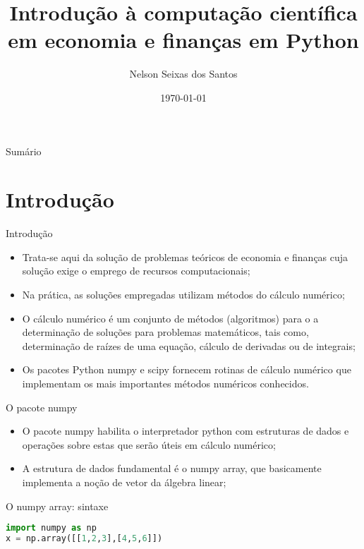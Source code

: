 \documentclass{beamer}
\title[Python2]{Introdução à computação científica em economia e finanças em Python}
\author{Nelson Seixas dos Santos}
\institute{Faculdade de Ciências Econômicas\\Universidade Federal do Rio Grande do Sul}
\date{\today}
\begin{document}
	
	\begin{frame}
		\titlepage
	\end{frame}
	
	\begin{frame}{Sumário}
		\tableofcontents
	\end{frame}
	
	
	
\section{Introdução}
\begin{frame}{Introdução}
\begin{itemize}
			\item Trata-se aqui da solução de problemas teóricos de economia e finanças cuja solução exige o emprego de recursos computacionais;
			\item Na prática, as soluções empregadas utilizam métodos do cálculo numérico;
			\item O cálculo numérico é um conjunto de métodos (algoritmos) para o a determinação de soluções para problemas matemáticos, tais como, determinação de raízes de uma equação, cálculo de derivadas ou de integrais;  
			\item Os pacotes Python numpy e scipy fornecem rotinas de cálculo numérico que implementam os mais importantes métodos numéricos conhecidos.  
\end{itemize}
\end{frame}
	
	
	\begin{frame}{O pacote numpy}
		\begin{itemize}
			\item O pacote numpy habilita o interpretador python com estruturas de dados e operações sobre estas que serão úteis em cálculo numérico;
			\item A estrutura de dados fundamental é o numpy array, que basicamente implementa a noção de vetor da álgebra linear;
			
		\end{itemize}
	\end{frame}
	

\begin{frame}[fragile]{O numpy array: sintaxe}
\begin{lstlisting}[language=Python]
import numpy as np
x = np.array([[1,2,3],[4,5,6]])		
\end{lstlisting}		
\end{frame}
\end{document}
